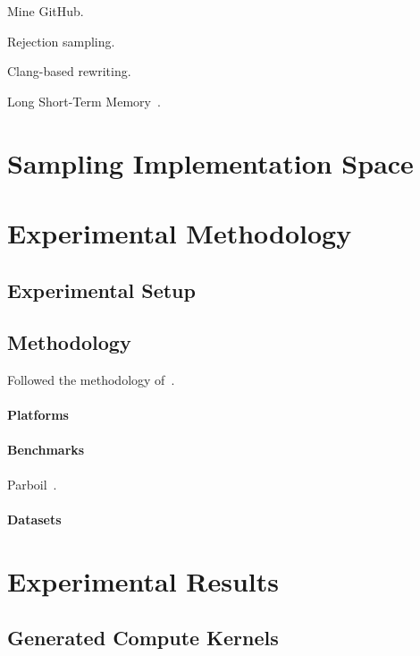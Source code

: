 \documentclass[preprint,nonatbib,10pt,nocopyrightspace]{sigplanconf}
\begin{document}
Mine GitHub.

Rejection sampling.

Clang-based rewriting.

Long Short-Term Memory~\cite{Hochreiter1997}.

\section{Sampling Implementation Space}\label{sec:}


\section{Experimental Methodology}\label{sec:evaluation}


\subsection{Experimental Setup}\label{subsec:}


\subsection{Methodology}\label{subsec:}

Followed the methodology of~\cite{Grewe2013}.


\paragraph{Platforms}\label{subsec:}


\paragraph{Benchmarks}\label{subsec:}

Parboil~\cite{Stratton2012}.


\paragraph{Datasets}\label{subsec:}


\section{Experimental Results}\label{sec:evaluation}

\subsection{Generated Compute Kernels}\label{subsec:}
\end{document}
